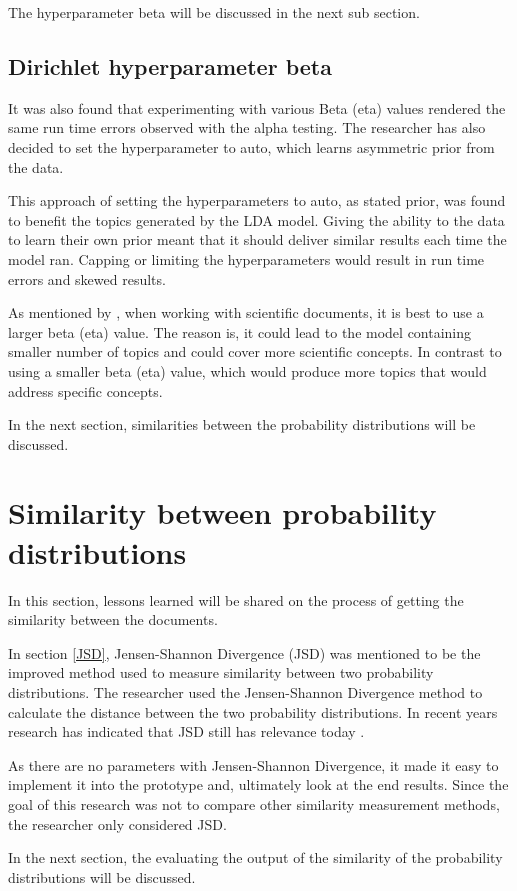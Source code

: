 The hyperparameter beta will be discussed in the next sub section.
\subsection{Dirichlet hyperparameter beta}
It was also found that experimenting with various Beta (eta) values rendered the same run time errors observed with the alpha testing. The researcher has also decided to set the hyperparameter to auto, which learns asymmetric prior from the data.

This approach of setting the hyperparameters to auto, as stated prior, was found to benefit the topics generated by the LDA model. Giving the ability to the data to learn their own prior meant that it should deliver similar results each time the model ran. Capping or limiting the hyperparameters would result in run time errors and skewed results.

As mentioned by , when working with scientific documents, it is best to use a larger beta (eta) value. The reason is, it could lead to the model containing smaller number of topics and could cover more scientific concepts. In contrast to using a smaller beta (eta) value, which would produce more topics that would address specific concepts.

In the next section, similarities between the probability distributions will be discussed.
\section{Similarity between probability distributions}
In this section, lessons learned will be shared on the process of getting the similarity between the documents.

In section \ref{JSD}, Jensen-Shannon Divergence (JSD) was mentioned to be the improved method used to measure similarity between two probability distributions.
The researcher used the Jensen-Shannon Divergence method to calculate the distance between the two probability distributions. In recent years research has indicated that JSD still has relevance today \cite{tong2016text,giles2019subject,he2015topic,chu2010topic}.

As there are no parameters with Jensen-Shannon Divergence, it made it easy to implement it into the prototype and, ultimately look at the end results. Since the goal of this research was not to compare other similarity measurement methods, the researcher only considered JSD.

In the next section, the evaluating the output of the similarity of the probability distributions will be discussed.

